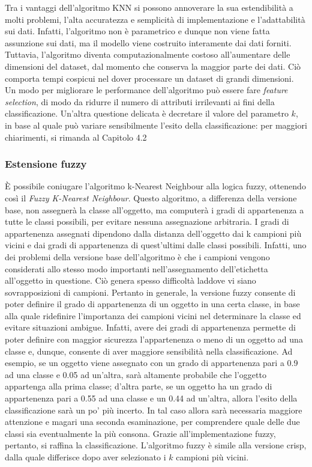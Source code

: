 \documentclass[11pt]{article}
\begin{document}
Tra i vantaggi dell'algoritmo KNN si possono annoverare la sua estendibilità a molti problemi, l'alta accuratezza e semplicità di implementazione e l'adattabilità sui dati. Infatti, l'algoritmo non è parametrico e dunque non viene fatta assunzione sui dati, ma il modello viene costruito interamente dai dati forniti. Tuttavia, l'algoritmo diventa computazionalmente costoso all'aumentare delle dimensioni del dataset, dal momento che conserva la maggior parte dei dati. Ciò comporta tempi cospicui nel dover processare un dataset di grandi dimensioni. Un modo per migliorare le performance dell'algoritmo può essere fare \textit{feature selection}, di modo da ridurre il numero di attributi irrilevanti ai fini della classificazione. Un'altra questione delicata è decretare il valore del parametro $k$, in base al quale può variare sensibilmente l'esito della classificazione: per maggiori chiarimenti, si rimanda al Capitolo 4.2

\subsubsection{Estensione fuzzy}

\`E possibile coniugare l'algoritmo k-Nearest Neighbour alla logica fuzzy, ottenendo così il \textit{Fuzzy K-Nearest Neighbour}. Questo algoritmo, a differenza della versione base, non assegnerà la classe all'oggetto, ma computerà i gradi di appartenenza a tutte le classi possibili, per evitare nessuna assegnazione arbitraria. I gradi di appartenenza assegnati dipendono dalla distanza dell'oggetto dai k campioni più vicini e dai gradi di appartenenza di quest'ultimi dalle classi possibili. Infatti, uno dei problemi della versione base dell'algoritmo è che i campioni vengono considerati allo stesso modo importanti nell'assegnamento dell'etichetta all'oggetto in questione. Ciò genera spesso difficoltà laddove vi siano sovrapposizioni di campioni. Pertanto in generale, la versione fuzzy consente di poter definire il grado di appartenenza di un oggetto in una certa classe, in base alla quale ridefinire l'importanza dei campioni vicini nel determinare la classe ed evitare situazioni ambigue. Infatti, avere dei gradi di appartenenza permette di poter definire con maggior sicurezza l'appartenenza o meno di un oggetto ad una classe e, dunque, consente di aver maggiore sensibilità nella classificazione. Ad esempio, se un oggetto viene assegnato con un grado di appartenenza pari a 0.9 ad una classe e 0.05 ad un'altra, sarà altamente probabile che l'oggetto appartenga alla prima classe; d'altra parte, se un oggetto ha un grado di appartenenza pari a 0.55 ad una classe e un 0.44 ad un'altra, allora l'esito della classificazione sarà un po' più incerto. In tal caso allora sarà necessaria maggiore attenzione e magari una seconda esaminazione, per comprendere quale delle due classi sia eventualmente la più consona. Grazie all'implementazione fuzzy, pertanto, si raffina la classificazione. L'algoritmo fuzzy è simile alla versione crisp, dalla quale differisce dopo aver selezionato i $k$ campioni più vicini. 
\end{document}
